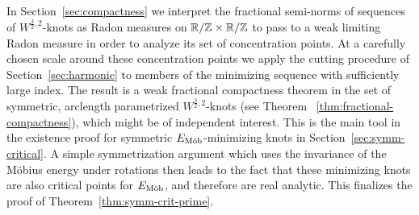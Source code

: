In Section~\ref{sec:compactness} we interpret
the fractional semi-norms of sequences of $W^{\frac32,2}$-knots as Radon measures
on $\mathbb{R}/\mathbb{Z}\times\mathbb{R}/\mathbb{Z}$ to pass to a weak limiting  Radon measure in order to analyze
its set of concentration points.  At  a carefully chosen scale around these 
concentration points we apply the cutting procedure of 
Section~\ref{sec:harmonic}
to members of the minimizing sequence with sufficiently large
index. The result
is a weak fractional compactness theorem in the set of symmetric, arclength 
parametrized $W^{\frac32,2}$-knots (see Theorem~
\ref{thm:fractional-compactness}), which
might be of independent interest. This is the main tool in the existence proof
for symmetric ${E_\textnormal{M\"ob}}$-minimizing knots in Section~\ref{sec:symm-critical}. A simple
symmetrization argument which  uses the invariance of the M\"obius energy under rotations
then leads to the fact that these minimizing knots are also critical points for
${E_\textnormal{M\"ob}}$, and therefore are real analytic. This
finalizes the proof of Theorem~\ref{thm:symm-crit-prime}.
